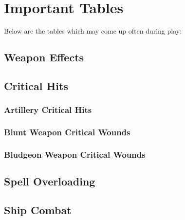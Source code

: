 \appendix
\chapter{Important Tables}
\label{ap:important-tables}
Below are the tables which may come up often during play:
\section{Weapon Effects}


\section{Critical Hits}
\label{critical-hits}

\subsection{Artillery Critical Hits}
\label{critical-hits-artillery}

\subsection{Blunt Weapon Critical Wounds}
\label{critical-hits-blunt}
\begin{normbox}\end{normbox}

\subsection{Bludgeon Weapon Critical Wounds}
\label{critical-hits-bludgeon}
\begin{normbox}\end{normbox}

\section{Spell Overloading}


\section{Ship Combat}
\begin{multicols}{2}
\begin{normbox}

\end{normbox}
\begin{normbox}

\end{normbox}
\end{multicols}